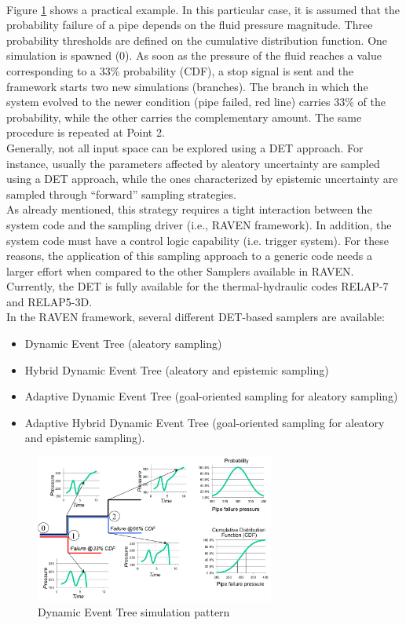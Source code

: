 \\Figure \ref{fig:DETschemeExample} shows a practical example. In this particular case, it is assumed that the 
probability failure of a pipe depends on the fluid pressure magnitude. Three probability thresholds are defined on 
the cumulative distribution function. One simulation is spawned (0). As soon as the pressure of the fluid reaches a 
value corresponding to a 33\% probability (CDF), a stop signal is sent and the framework starts two new 
simulations (branches). The branch in which the system evolved to the newer condition (pipe failed, red line) 
carries 33\% of the probability, while the other carries the complementary amount. The same procedure is repeated at 
Point 2.
\\Generally, not all  input space can be explored using a DET approach. For instance, usually the parameters affected by aleatory uncertainty are sampled using a DET approach, while the ones characterized by epistemic uncertainty are sampled through ``forward'' sampling strategies. 
\\As already mentioned, this strategy requires a tight interaction between the system code and the sampling driver (i.e., RAVEN framework). In addition, the system code must have a control logic capability (i.e. trigger system). For these reasons, the application of this sampling approach to a generic code needs a larger effort when compared to the other Samplers available in RAVEN. Currently, the DET is fully available for the thermal-hydraulic codes RELAP-7 and RELAP5-3D.
\\In the RAVEN framework, several different DET-based samplers are available:
\begin{itemize}
\item Dynamic Event Tree (aleatory sampling)
\item Hybrid Dynamic Event Tree (aleatory and epistemic sampling)
\item Adaptive Dynamic Event Tree (goal-oriented sampling for aleatory sampling)
\item Adaptive Hybrid Dynamic Event Tree (goal-oriented sampling for aleatory and epistemic sampling).
\end{itemize}

\begin{figure}
  \centering
  \includegraphics[width=0.7\textwidth]  {pics/DETscheme.png}
  \caption{Dynamic Event Tree simulation pattern}
  \label{fig:DETschemeExample}
\end{figure}

